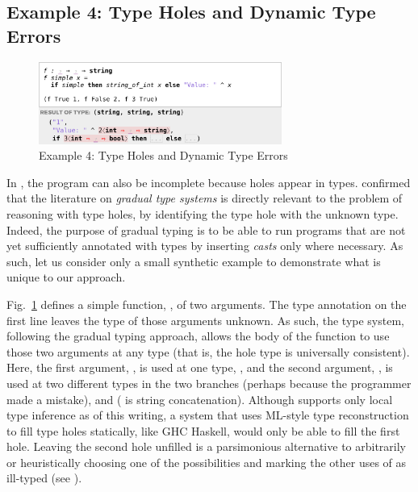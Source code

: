 
\subsection{Example 4: Type Holes and Dynamic Type Errors}
\label{sec:dynamic-type-errors}

\begin{figure}
\centering
\includegraphics[width=0.71\textwidth,interpolate=false,valign=t]{images/cast-errors.png}
\caption{Example 4: Type Holes and Dynamic Type Errors}
\label{fig:cast-errors}
\vspace{-6px}
\end{figure}


In \Hazel, the program can also be incomplete because holes appear in types. 
\citet{popl-paper} confirmed that the literature on \emph{gradual type systems} \cite{Siek06a,DBLP:conf/snapl/SiekVCB15} is directly relevant to the problem of reasoning with type holes, by identifying the type hole with the unknown type. 
Indeed, the purpose of gradual typing is to be able to run programs that are not yet sufficiently annotated with types by inserting \emph{casts} only where necessary. As such, let us consider only a small synthetic example to demonstrate what is unique to our approach.

Fig.~\ref{fig:cast-errors} defines a simple function, , of two arguments. 
The type annotation on the first line leaves the type of those arguments unknown. 
As such, the \Hazel type system, following the gradual typing approach,
allows the body of the function to use those two
arguments at any type (that is, the hole type is universally consistent). 
Here, the first argument, , is used at one type, , 
and the second argument, , is used at two different types in the two branches (perhaps because the programmer made a mistake), 
  and    ( \li{^} is string concatenation).
Although \Hazel supports only local type inference as of this writing, 
a system that uses ML-style type reconstruction to fill type holes statically, like GHC Haskell, would only be able to fill the first hole. Leaving the second hole unfilled is 
a parsimonious alternative to arbitrarily or heuristically choosing one of the possibilities and marking the
other uses of  as ill-typed (see \cite{DBLP:journals/jfp/ChenE18}).

